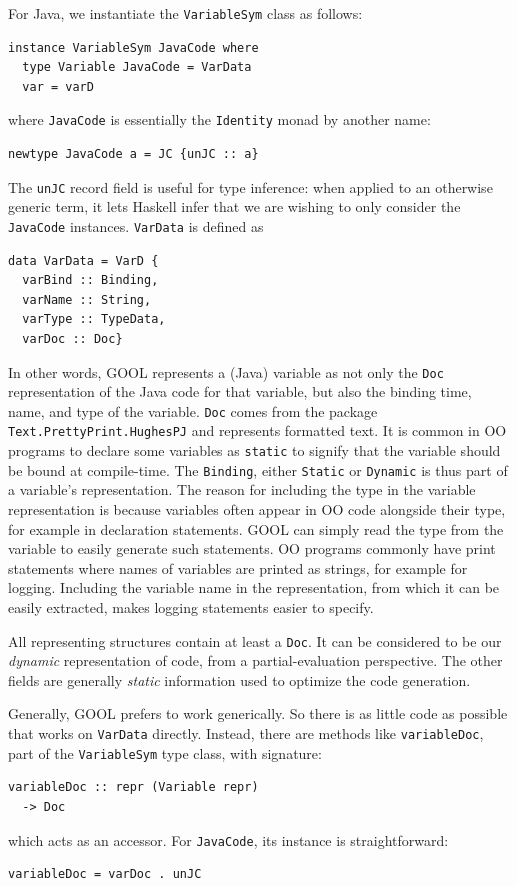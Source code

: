 \documentclass[sigplan,review,anonymous,prologue,dvipsnames]{acmart}
\begin{document}
For Java, we instantiate the \verb|VariableSym| class as follows:
\begin{lstlisting}
instance VariableSym JavaCode where
  type Variable JavaCode = VarData
  var = varD
\end{lstlisting}
where \verb|JavaCode| is essentially the \verb|Identity| monad
by another name:
\begin{lstlisting}
newtype JavaCode a = JC {unJC :: a}
\end{lstlisting}
The \verb|unJC| record field is useful for type inference: when applied to
an otherwise generic term, it lets Haskell infer that we are wishing
to only consider the \verb|JavaCode| instances.  \verb|VarData| is defined as
\begin{lstlisting}
data VarData = VarD {
  varBind :: Binding,
  varName :: String,
  varType :: TypeData,
  varDoc :: Doc}
\end{lstlisting}
In other words, GOOL represents a (Java) variable as not only the \verb|Doc| 
representation of the Java code for that variable, but also the binding time, 
name, and type of the variable. \verb|Doc| comes from the package 
\verb|Text.PrettyPrint.HughesPJ| and represents formatted text. It is common in 
OO programs to declare some variables as \verb|static| to signify that the 
variable should be bound at compile-time. The \verb|Binding|, either 
\verb|Static| or \verb|Dynamic| is thus part of a variable's representation.
The reason for including the type in the variable representation is because 
variables often appear in OO code alongside their type, for example in 
declaration statements. GOOL can simply read the type from the variable to 
easily generate such statements. OO programs 
commonly have print statements where names of variables are printed as strings, 
for example for logging. Including the variable name in the representation, 
from which it can be easily extracted, makes logging statements easier to 
specify. 

All representing structures contain at least a \verb|Doc|. It can be considered
to be our \emph{dynamic} representation of code, from a partial-evaluation
perspective. The other fields are generally \emph{static} information used to
optimize the code generation.

Generally, GOOL prefers to work generically. So there is as little code as
possible that works on \verb|VarData| directly.  Instead, there are
methods like \verb|variableDoc|, part of the \verb|VariableSym| type class,
with signature:
\begin{lstlisting}
variableDoc :: repr (Variable repr)
  -> Doc
\end{lstlisting}
which acts as an accessor.  For \verb|JavaCode|, its instance is
straightforward:
\begin{lstlisting}
variableDoc = varDoc . unJC
\end{lstlisting}
\end{document}
